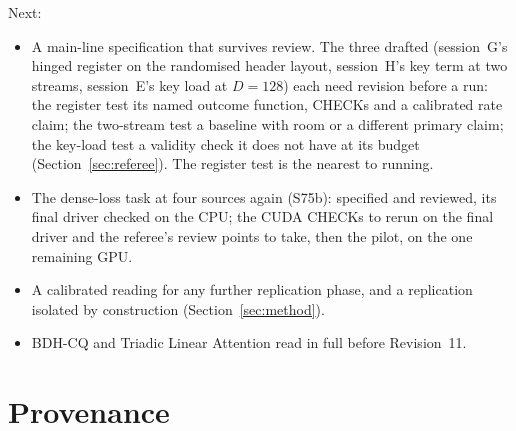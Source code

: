 \documentclass[11pt]{article}
\begin{document}
Next:
\begin{itemize}
\item A main-line specification that survives review. The three drafted (session~G's hinged register on the randomised header layout, session~H's key term at two streams, session~E's key load at $D = 128$) each need revision before a run: the register test its named outcome function, CHECKs and a calibrated rate claim; the two-stream test a baseline with room or a different primary claim; the key-load test a validity check it does not have at its budget (Section~\ref{sec:referee}). The register test is the nearest to running.
\item The dense-loss task at four sources again (S75b): specified and reviewed, its final driver checked on the CPU; the CUDA CHECKs to rerun on the final driver and the referee's review points to take, then the pilot, on the one remaining GPU.
\item A calibrated reading for any further replication phase, and a replication isolated by construction (Section~\ref{sec:method}).
\item BDH-CQ and Triadic Linear Attention read in full before Revision~11.
\end{itemize}

\appendix
\section{Provenance}
\label{app:prov}
\end{document}
